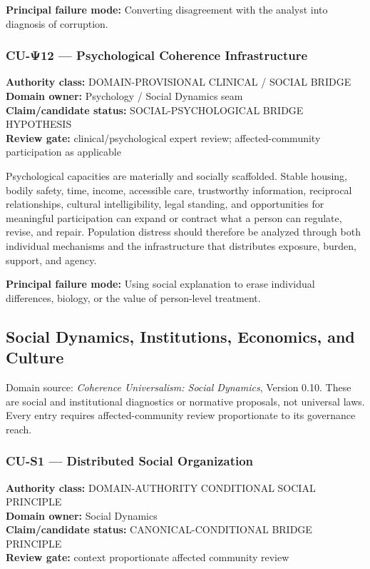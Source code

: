 \documentclass[
  11pt,
]{article}
\begin{document}
\textbf{Principal failure mode:} Converting disagreement with the
analyst into diagnosis of corruption.

\subsubsection{CU-Ψ12 --- Psychological Coherence
Infrastructure}\label{cu-ux3c812-psychological-coherence-infrastructure}

\textbf{Authority class:} DOMAIN-PROVISIONAL CLINICAL / SOCIAL BRIDGE\\
\textbf{Domain owner:} Psychology / Social Dynamics seam\\
\textbf{Claim/candidate status:} SOCIAL-PSYCHOLOGICAL BRIDGE
HYPOTHESIS\\
\textbf{Review gate:} clinical/psychological expert review;
affected-community participation as applicable

Psychological capacities are materially and socially scaffolded. Stable
housing, bodily safety, time, income, accessible care, trustworthy
information, reciprocal relationships, cultural intelligibility, legal
standing, and opportunities for meaningful participation can expand or
contract what a person can regulate, revise, and repair. Population
distress should therefore be analyzed through both individual mechanisms
and the infrastructure that distributes exposure, burden, support, and
agency.

\textbf{Principal failure mode:} Using social explanation to erase
individual differences, biology, or the value of person-level treatment.

\subsection{Social Dynamics, Institutions, Economics, and
Culture}\label{social-dynamics-institutions-economics-and-culture}

Domain source: \emph{Coherence Universalism: Social Dynamics}, Version
0.10. These are social and institutional diagnostics or normative
proposals, not universal laws. Every entry requires affected-community
review proportionate to its governance reach.

\subsubsection{CU-S1 --- Distributed Social
Organization}\label{cu-s1-distributed-social-organization}

\textbf{Authority class:} DOMAIN-AUTHORITY CONDITIONAL SOCIAL
PRINCIPLE\\
\textbf{Domain owner:} Social Dynamics\\
\textbf{Claim/candidate status:} CANONICAL-CONDITIONAL BRIDGE
PRINCIPLE\\
\textbf{Review gate:} context proportionate affected community review
\end{document}

